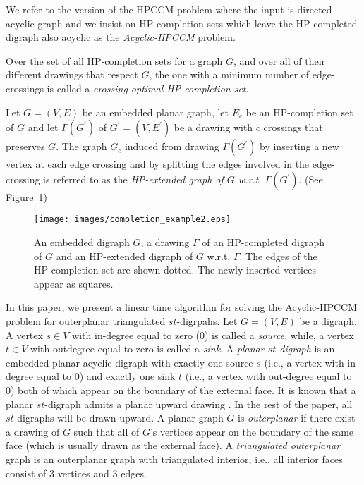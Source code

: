 \documentclass{myllncs-mixalis}
\begin{document}
We refer to the version of the HPCCM problem where the input is
directed acyclic graph and we
 insist on HP-completion
sets which leave the HP-completed digraph also acyclic as the
\emph{Acyclic-HPCCM} problem.

Over the set of all HP-completion sets for a graph $G$, and over all
of their different drawings that respect $G$, the one with a minimum
number of edge-crossings is called a \emph{crossing-optimal
HP-completion set}.


Let $G=(V,E)$ be an embedded  planar graph, let $E_c$ be an
HP-completion set of $G$ and let $\Gamma(G^\prime)$ of $G^\prime =
(V, E^\prime)$ be a drawing with $c$ crossings that preserves  $G$.
The graph $G_c$ induced from drawing $\Gamma(G^\prime)$ by inserting
a new vertex at each edge crossing and by splitting the edges
involved in the edge-crossing is referred to as the
\emph{HP-extended graph of $G$ w.r.t. $\Gamma(G^\prime)$}. (See
Figure~\ref{fig:HPextended})






\begin{figure}[htb]
    \begin{minipage}{\textwidth}
    \centering
    \texttt{[image: images/completion\_example2.eps]}
    \caption{An embedded digraph $G$, a drawing $\Gamma$ of an HP-completed digraph of $G$
    and an HP-extended digraph of $G$ w.r.t. $\Gamma$. The edges of the HP-completion set are shown dotted.
    The newly inserted vertices appear as squares.}
    \label{fig:HPextended}
  \end{minipage}
\end{figure}

In this paper, we present a linear time algorithm for solving the
Acyclic-HPCCM problem for outerplanar triangulated $st$-digrpahs.
Let $G=(V,E)$ be a  digraph. A vertex $s \in V$ with in-degree equal
to zero (0)  is called a \emph{source}, while, a vertex $t \in V$
with outdegree equal to zero is called a  \emph{sink}. A
\emph{planar $st$-digraph} is an embedded  planar acyclic digraph
with exactly one source $s$ (i.e., a vertex with in-degree equal to
0) and exactly one sink $t$ (i.e., a vertex with out-degree equal to
0) both of which appear on the boundary of the external face. It is
known that a planar $st$-digraph admits a planar upward drawing
\cite{Kelly87,DiBattistaT88}. In the rest of the paper, all
$st$-digraphs will be drawn upward. A planar graph $G$ is
\emph{outerplanar} if there exist a drawing of $G$ such that all of
$G$'s vertices appear on the boundary of the same face (which is
usually drawn as the external face). A \emph{triangulated
outerplanar} graph is an outerplanar graph with triangulated
interior, i.e., all interior faces consist of 3 vertices and 3
edges.
\end{document}
